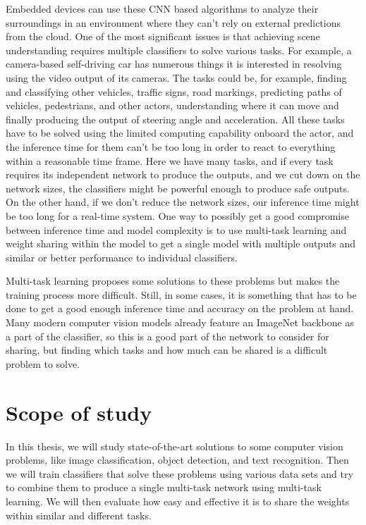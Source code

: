 Embedded devices can use these CNN based algorithms to analyze their surroundings in an environment where they can't rely on external predictions from the cloud. One of the most significant issues is that achieving scene understanding requires multiple classifiers to solve various tasks. For example, a camera-based self-driving car has numerous things it is interested in resolving using the video output of its cameras. The tasks could be, for example, finding and classifying other vehicles, traffic signs, road markings, predicting paths of vehicles, pedestrians, and other actors, understanding where it can move and finally producing the output of steering angle and acceleration. All these tasks have to be solved using the limited computing capability onboard the actor, and the inference time for them can't be too long in order to react to everything within a reasonable time frame. Here we have many tasks, and if every task requires its independent network to produce the outputs, and we cut down on the network sizes, the classifiers might be powerful enough to produce safe outputs. On the other hand, if we don't reduce the network sizes, our inference time might be too long for a real-time system. One way to possibly get a good compromise between inference time and model complexity is to use multi-task learning and weight sharing within the model to get a single model with multiple outputs and similar or better performance to individual classifiers.

Multi-task learning proposes some solutions to these problems but makes the training process more difficult. Still, in some cases, it is something that has to be done to get a good enough inference time and accuracy on the problem at hand. Many modern computer vision models already feature an ImageNet backbone as a part of the classifier, so this is a good part of the network to consider for sharing, but finding which tasks and how much can be shared is a difficult problem to solve.

\section{Scope of study}
In this thesis, we will study state-of-the-art solutions to some computer vision problems, like image classification, object detection, and text recognition. Then we will train classifiers that solve these problems using various data sets and try to combine them to produce a single multi-task network using multi-task learning. We will then evaluate how easy and effective it is to share the weights within similar and different tasks.
